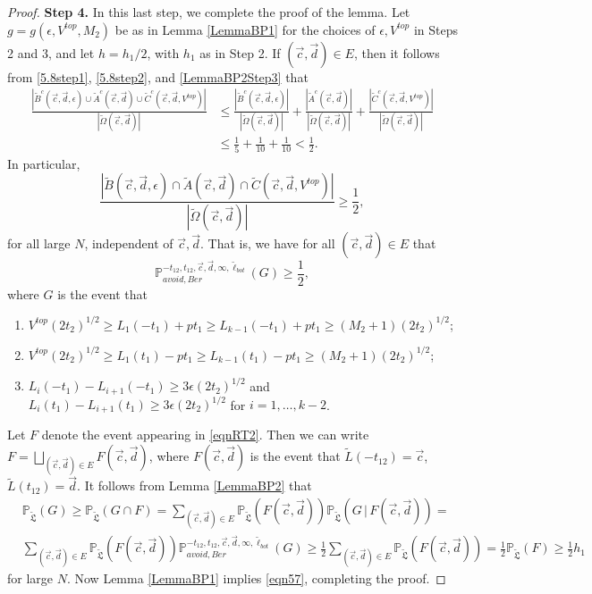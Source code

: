 \begin{proof}
	{\bf \raggedleft Step 4.} In this last step, we complete the proof of the lemma. Let $g=g(\epsilon,V^{top},M_2)$ be as in Lemma \ref{LemmaBP1} for the choices of $\epsilon,V^{top}$ in Steps 2 and 3, and let $h = h_1/2$, with $h_1$ as in Step 2. If $(\vec{c},\vec{d})\in E$, then it follows from \eqref{5.8step1}, \eqref{5.8step2}, and \eqref{LemmaBP2Step3} that
	\begin{align*}
	\frac{|\tilde{B}^c(\vec{c}, \vec{d}, \epsilon) \cup \tilde{A}^c(\vec{c}, \vec{d}) \cup \tilde{C}^c(\vec{c}, \vec{d}, V^{top}) |}{|\tilde{\Omega}(\vec{c}, \vec{d})|} &\leq \frac{|\tilde{B}^c(\vec{c}, \vec{d}, \epsilon)|}{|\tilde{\Omega}(\vec{c}, \vec{d})|} + \frac{| \tilde{A}^c(\vec{c}, \vec{d}) |}{|\tilde{\Omega}(\vec{c}, \vec{d})|} + \frac{|\tilde{C}^c(\vec{c}, \vec{d}, V^{top}) |}{|\tilde{\Omega}(\vec{c}, \vec{d})|}\\
	&\leq \frac{1}{5} + \frac{1}{10} + \frac{1}{10} < \frac{1}{2}.
	\end{align*}
	In particular,
	\begin{equation}
	\frac{|\tilde{B}(\vec{c}, \vec{d}, \epsilon) \cap \tilde{A}(\vec{c}, \vec{d}) \cap \tilde{C}(\vec{c}, \vec{d}, V^{top}) |}{|\tilde{\Omega}(\vec{c}, \vec{d})|} \geq  \frac{1}{2},
	\end{equation}
	for all large $N$, independent of $\vec{c},\vec{d}$. That is, we have for all $(\vec{c}, \vec{d}) \in E$ that
	$$\mathbb{P}_{avoid, Ber}^{-t_{12}, t_{12}, \vec{c}, \vec{d}, \infty, \tilde{\ell}_{bot}} ( G) \geq \frac{1}{2},$$
	where $G$ is the event that
	
	\begin{enumerate}
		\item $V^{top} (2t_2)^{1/2} \geq L_1(-t_1) + p t_1 \geq L_{k-1}(-t_1) + pt_1 \geq (M_2 + 1) (2t_2)^{1/2}$;
		\item $V^{top} (2t_2)^{1/2} \geq L_1(t_1) - p t_1 \geq L_{k-1}(t_1) - pt_1 \geq (M_2 + 1) (2t_2)^{1/2}$; 
		\item $L_i(-t_1) -L_{i+1}(-t_1) \geq 3\epsilon (2t_2)^{1/2}$ and $L_i(t_1) -L_{i+1}(t_1)  \geq 3 \epsilon (2t_2)^{1/2}$ for $i = 1, \dots, k-2$.
	\end{enumerate}
	Let $F$ denote the event appearing in \eqref{eqnRT2}. Then we can write $F = \bigsqcup_{(\vec{c},\vec{d})\in E} F(\vec{c},\vec{d})$, where $F(\vec{c},\vec{d})$ is the event that $\tilde{L}(-t_{12}) = \vec{c}$, $\tilde{L}(t_{12}) = \vec{d}$. It follows from Lemma \ref{LemmaBP2} that
	\begin{align*}
	&\mathbb{P}_{\tilde{\mathfrak{L}}}(G) \geq \mathbb{P}_{\tilde{\mathfrak{L}}}(G\cap F) = \sum_{(\vec{c},\vec{d})\in E} \mathbb{P}_{\tilde{\mathfrak{L}}}(F(\vec{c},\vec{d})) \mathbb{P}_{\tilde{\mathfrak{L}}}(G\,|\,F(\vec{c},\vec{d})) =\\
	&\sum_{(\vec{c},\vec{d})\in E} \mathbb{P}_{\tilde{\mathfrak{L}}}(F(\vec{c},\vec{d})) \mathbb{P}^{-t_{12},t_{12},\vec{c},\vec{d},\infty,\tilde{\ell}_{bot}}_{avoid,Ber}(G) \geq \frac{1}{2}\sum_{(\vec{c},\vec{d})\in E} \mathbb{P}_{\tilde{\mathfrak{L}}}(F(\vec{c},\vec{d})) = \frac{1}{2}\mathbb{P}_{\tilde{\mathfrak{L}}}(F) \geq \frac{1}{2}h_1
	\end{align*}
	for large $N$. Now Lemma \ref{LemmaBP1} implies \eqref{eqn57}, completing the proof.
\end{proof}